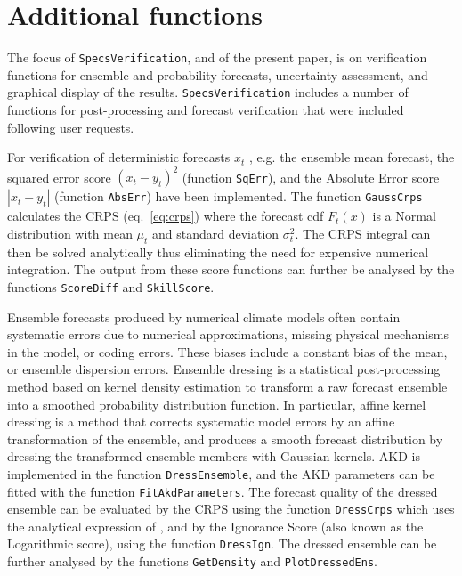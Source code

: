 \documentclass[10pt]{article}\usepackage[]{graphicx}\usepackage[]{color}
\newcommand{\pkg}[1]{\texttt{#1}}
\newcommand{\code}[1]{\texttt{#1}}
\begin{document}
\section{Additional functions}

The focus of \pkg{SpecsVerification}, and of the present paper, is on verification functions for ensemble and probability forecasts, uncertainty assessment, and graphical display of the results.
\pkg{SpecsVerification} includes a number of functions for post-processing and forecast verification that were included following user requests.


For verification of deterministic forecasts $x_t$ , e.g. the ensemble mean forecast, the squared error score $(x_t - y_t)^2$ (function \code{SqErr}), and the Absolute Error score $|x_t - y_t|$ (function \code{AbsErr}) have been implemented.
The function \code{GaussCrps} calculates the CRPS (eq.~\ref{eq:crps}) where the forecast cdf $F_t(x)$ is a Normal distribution with mean $\mu_t$ and standard deviation $\sigma^2_t$.
The CRPS integral can then be solved analytically \citep{gneiting2005calibrated} thus eliminating the need for expensive numerical integration.
The output from these score functions can further be analysed by the functions \code{ScoreDiff} and \code{SkillScore}.


Ensemble forecasts produced by numerical climate models often contain systematic errors due to numerical approximations, missing physical mechanisms in the model, or coding errors.
These biases include a constant bias of the mean, or ensemble dispersion errors.
Ensemble dressing is a statistical post-processing method based on kernel density estimation to transform a raw forecast ensemble into a smoothed probability distribution function.
In particular, affine kernel dressing \citep[AKD; ][]{broecker2008from} is a method that corrects systematic model errors by an affine transformation of the ensemble, and produces a smooth forecast distribution by dressing the transformed ensemble members with Gaussian kernels.
AKD is implemented in the function \code{DressEnsemble}, and the AKD parameters can be fitted with the function \code{FitAkdParameters}. 
The forecast quality of the dressed ensemble can be evaluated by the CRPS using the function \code{DressCrps} which uses the analytical expression of \citet{grimit2006the}, and by the Ignorance Score \citep{roulston2002evaluating} (also known as the Logarithmic score), using the function \code{DressIgn}.
The dressed ensemble can be further analysed by the functions \code{GetDensity} and \code{PlotDressedEns}.
\end{document}
